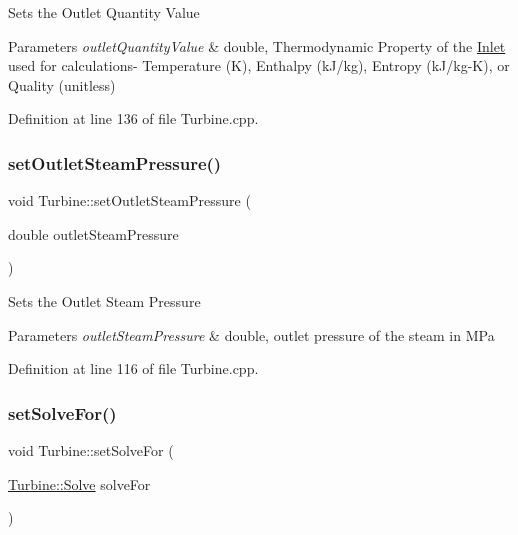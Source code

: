 Sets the Outlet Quantity Value


\begin{DoxyParams}{Parameters}
{\em outlet\+Quantity\+Value} & double, Thermodynamic Property of the \hyperlink{class_inlet}{Inlet} used for calculations-\/ Temperature (K), Enthalpy (k\+J/kg), Entropy (k\+J/kg-\/K), or Quality (unitless) \\
\hline
\end{DoxyParams}


Definition at line 136 of file Turbine.\+cpp.

\mbox{\label{class_turbine_ab9612657de02e4523492b687917b4091}} 
\subsubsection{\texorpdfstring{set\+Outlet\+Steam\+Pressure()}{setOutletSteamPressure()}}
{\footnotesize\ttfamily void Turbine\+::set\+Outlet\+Steam\+Pressure (\begin{DoxyParamCaption}\item[{double}]{outlet\+Steam\+Pressure }\end{DoxyParamCaption})}

Sets the Outlet Steam Pressure


\begin{DoxyParams}{Parameters}
{\em outlet\+Steam\+Pressure} & double, outlet pressure of the steam in M\+Pa \\
\hline
\end{DoxyParams}


Definition at line 116 of file Turbine.\+cpp.

\mbox{\label{class_turbine_a96f54a8fc572dae6c5298289de890f4d}} 
\subsubsection{\texorpdfstring{set\+Solve\+For()}{setSolveFor()}}
{\footnotesize\ttfamily void Turbine\+::set\+Solve\+For (\begin{DoxyParamCaption}\item[{\hyperlink{class_turbine_a9fd7beba6c6f071e228fbe3e07969d2b}{Turbine\+::\+Solve}}]{solve\+For }\end{DoxyParamCaption})}

